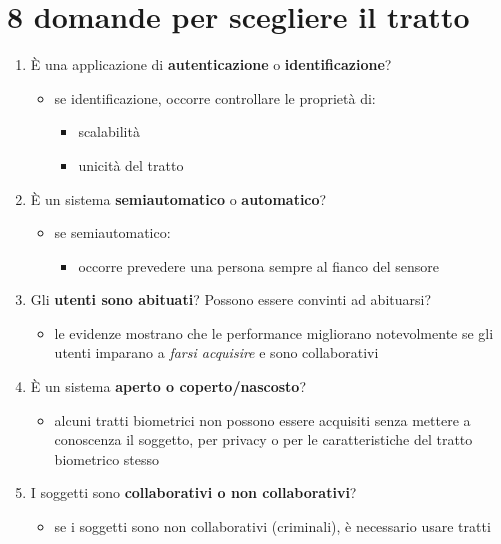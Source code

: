 \documentclass{report}
\begin{document}
\newpage
\section{8 domande per scegliere il tratto}

\begin{enumerate}
    \item È una applicazione di \textbf{autenticazione} o \textbf{identificazione}?
    \begin{itemize}
        \item se identificazione, occorre controllare le proprietà di:
        \begin{itemize}
            \item scalabilità
            \item unicità del tratto
        \end{itemize}
    \end{itemize}
    \item È un sistema \textbf{semiautomatico} o \textbf{automatico}?
    \begin{itemize}
        \item se semiautomatico:
        \begin{itemize}
            \item occorre prevedere una persona sempre al fianco del sensore
        \end{itemize}
    \end{itemize}
    \item Gli \textbf{utenti sono abituati}? Possono essere convinti ad abituarsi?
    \begin{itemize}
        \item le evidenze mostrano che le performance migliorano notevolmente se gli utenti 
        imparano a \textit{farsi acquisire} e sono collaborativi
    \end{itemize}
    \item È un sistema \textbf{aperto o coperto/nascosto}?
    \begin{itemize}
        \item alcuni tratti biometrici non possono essere acquisiti senza mettere a conoscenza 
        il soggetto, per privacy o per le caratteristiche del tratto biometrico stesso
    \end{itemize}
    \item I soggetti sono \textbf{collaborativi o non collaborativi}?
    \begin{itemize}
        \item se i soggetti sono non collaborativi (criminali), è necessario usare tratti 

\end{itemize}
\end{enumerate}
\end{document}
